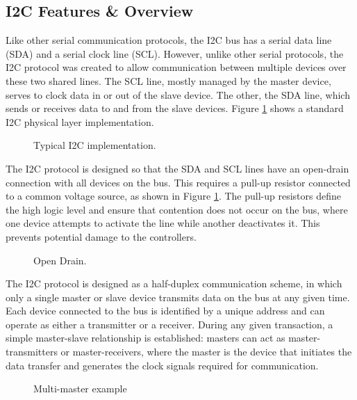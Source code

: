 \subsection{I2C Features \& Overview}
\label{chap:Back_I2C_Features_Overview}

Like other serial communication protocols, the I2C bus has a serial data line 
(SDA) and a serial clock line (SCL). However, unlike other serial protocols, the I2C 
protocol was created to allow communication between multiple devices over these 
two shared lines. The SCL line, mostly managed by the master device, serves to 
clock data in or out of the slave device. The other, the SDA line, which sends or 
receives data to and from the slave devices. Figure \ref{fig:I2C_imp} shows a standard I2C 
physical layer implementation.


\begin{figure}[H]
    \centering
    \caption{Typical I2C implementation.}
    \label{fig:I2C_imp}
\end{figure}


The I2C protocol is designed so that the SDA and SCL lines have an open-drain 
connection with all devices on the bus. This requires a pull-up resistor connected to 
a common voltage source, as shown in Figure \ref{fig:I2C_imp}. The pull-up resistors define 
the high logic level and ensure that contention does not occur on the bus, where 
one device attempts to activate the line while another deactivates it. This prevents 
potential damage to the controllers.


\begin{figure}[H]
    \centering
    \caption{Open Drain.}
    \label{fig:Open_Drain}
\end{figure}


The I2C protocol is designed as a half-duplex communication scheme, in which 
only a single master or slave device transmits data on the bus at any given time. 
Each device connected to the bus is identified by a unique address and can 
operate as either a transmitter or a receiver. During any given transaction, a simple 
master-slave relationship is established: masters can act as master-transmitters or 
master-receivers, where the master is the device that initiates the data transfer and generates 
the clock signals required for communication.


\begin{figure}[H]
    \centering
    \caption{Multi-master example}
    \label{fig:Multi_master}
\end{figure}


